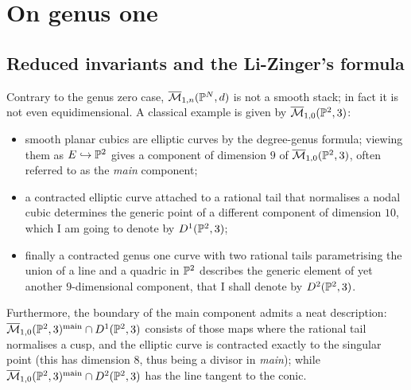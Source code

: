 \chapter{On genus one}\label{ch:hg}

\section{Reduced invariants and the Li-Zinger's formula}\label{sec:redinv}
Contrary to the genus zero case, $\overline{\mathcal{M}}_{1,n}(\mathbb P^N,d)$ is not a smooth stack; in fact it is not even equidimensional. A classical example is given by $\overline{\mathcal{M}}_{1,0}(\mathbb P^2,3)$:
\begin{itemize}
 \item smooth planar cubics are elliptic curves by the degree-genus formula; viewing them as $E\hookrightarrow \mathbb P^2$ gives a component of dimension $9$ of $\overline{\mathcal{M}}_{1,0}(\mathbb P^2,3)$, often referred to as the \emph{main} component;
 \item a contracted elliptic curve attached to a rational tail that normalises a nodal cubic determines the generic point of a different component of dimension $10$, which I am going to denote by $D^1(\mathbb P^2,3)$;
 \item finally a contracted genus one curve with two rational tails parametrising the union of a line and a quadric in $\mathbb P^2$ describes the generic element of yet another $9$-dimensional component, that I shall denote by $D^2(\mathbb P^2,3)$.
\end{itemize}
Furthermore, the boundary of the main component admits a neat description: $\overline{\mathcal{M}}_{1,0}(\mathbb P^2,3)^{\mathrm{main}}\cap D^1(\mathbb P^2,3)$ consists of those maps where the rational tail normalises a cusp, and the elliptic curve is contracted exactly to the singular point (this has dimension $8$, thus being a divisor in \emph{main}); while $\overline{\mathcal{M}}_{1,0}(\mathbb P^2,3)^{\mathrm{main}}\cap D^2(\mathbb P^2,3)$ has the line tangent to the conic.

